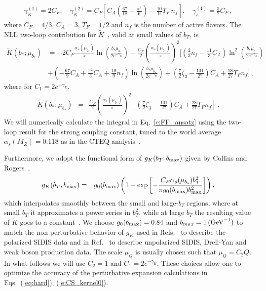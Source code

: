 \documentclass[a4paper]{article}
\newcommand{\bmax}{b_{\rm max}}
\newcommand\bstarsc{b_*}
\newcommand\mubstar{\mu_{\bstarsc}}
\newcommand{\bea}{\begin{eqnarray}}
\newcommand{\eea}{\end{eqnarray}}
\newcommand{\ps}[1]{{\color{magenta}#1}}
\begin{document}
\bea
\gamma_K^{(1)} =2 C_F,
\quad
\gamma_K^{(2)} ={C_F}\left[C_A\left(\frac{67}{18}-\frac{\pi^2}{6}\right)-\frac{10}{9}T_F \, n_f\right],
\quad
\gamma_i^{(1)} = \frac{3}{2} C_F
\, ,
\eea
where $C_F=4/3$, $C_A=3$, $T_F=1/2$ and $n_f$ is the number of active flavors.
The NLL two-loop contribution for $\tilde K$~\cite{Collins:2017oxh,Echevarria:2020hpy}, valid  at small values of $b_T$, is
\ps{\begin{align}
 \tilde K (b_*;\mubstar) &= -2 C_F \frac{\alpha_s(\mubstar)}{\pi} \ln \left(\frac{b_* \mu_{b_*}}{2 e^{-\gamma_E}}\right) 
 +
 \frac{C_F}{2}\left(\frac{\alpha_s(\mubstar)}{\pi}\right)^2\Bigg[ \left( \frac{2}{3} n_f - \frac{11}{3}C_A\right) \ln^2 \left(\frac{b_* \mu_{b_*}}{2 e^{-\gamma_E}}\right)
 \nonumber \\
 &+
 \left( -\frac{67}{9} C_A + \frac{\pi^2}{3}C_A + \frac{10}{9} n_f\right) \ln \left(\frac{b_* \mu_{b_*}}{2 e^{-\gamma_E}}\right) +
   \left(\frac{7}{2}\zeta_3-\frac{101}{27}\right) C_A + \frac{28}{27} T_F n_f 
 \Bigg] \, ,
 \label{e:CS_kernel0}   
\end{align}
where for $C_1 =2 e^{-\gamma_E}$,}
\begin{eqnarray}
\tilde K (b_*;\mubstar) &=& \frac{C_F}{2} \left(\frac{\alpha_s(\mubstar)}{\pi}\right)^2  \left[\left(\frac{7}{2}\zeta_3-\frac{101}{27}\right) C_A + \frac{28}{27} T_F n_f 
 \right] \, .
 \label{e:CS_kernel}
\end{eqnarray}
 We will numerically calculate  the integral in Eq.~\eqref{e:FF_ansatz} using the two-loop result for the strong coupling constant, tuned to the world average~\cite{Bethke:2012jm} $\alpha_s(M_Z)= 0.118$ as in the CTEQ analysis~\cite{Hou:2019efy}.

Furthermore, we adopt the functional form of $g_K(b_T;b_{\rm max})$ given by Collins and Rogers~\cite{Collins:2014jpa},
\bea
g_K(b_T,\bmax)&=&g_0(\bmax)\left(1-\exp\left[-\frac{C_F\alpha_s(\mubstar)b_T^2}{\pi g_0(\bmax)\bmax^2}\right]\right),
\eea
 which interpolates smoothly between the small and large-$b_T$ regions, where
at small $b_T$ it approximates a power series in $b_T^2$, while at large $b_T$ the resulting value of $\tilde K$ goes to a constant~\cite{Collins:2014jpa}. We choose  $g_0(\bmax)=0.84$ and $b_{max} = 1\,{\rm (GeV}^{-1})$ to match the non perturbative behavior of $g_K$ used in Refs.~\cite{Kang:2014zza,Kang:2015msa} to describe the  polarized SIDIS data and in Ref.~\cite{Su:2014wpa} to describe unpolarized SIDIS, Drell-Yan and weak boson production data. 
\ps{The scale $\mu_Q$ is usually chosen such that $\mu_Q= C_2 Q $. In what follows we will use $C_2 = 1$ and $C_1 = 2 e^{-\gamma_E}$. These choices allow one to optimize the accuracy of the perturbative expansion calculations in Eqs.~(\ref{eq:hard}), (\ref{e:CS_kernel0}). 
 }
\end{document}
